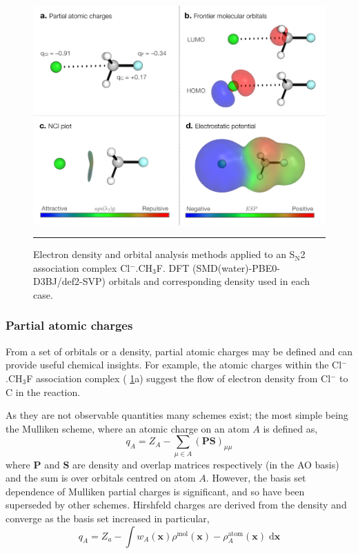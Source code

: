 \documentclass[main.tex]{subfiles}
\begin{document}
\begin{figure}[h!]
	\centering
	\includegraphics[width=\textwidth]{2/figs/fig2/analysis.pdf}
	\vspace{0.1cm}
	\hrule
	\caption{Electron density and orbital analysis methods applied to an S$_\text{N}$2 association complex Cl${}^{-}$.CH${}_3$F. DFT (SMD(water)-PBE0-D3BJ/def2-SVP) orbitals and corresponding density used in each case.}
	\label{fig::intro_analysis_methods}
\end{figure}


\subsubsection{Partial atomic charges}

From a set of orbitals or a density, partial atomic charges may be defined and can provide useful chemical insights. For example, the atomic charges within the Cl${}^{-}$.CH${}_3$F association complex (\figurename{ \ref{fig::intro_analysis_methods}a}) suggest the flow of electron density from Cl$^{-}$ to C in the reaction.

As they are not observable quantities many schemes exist; the most simple being the Mulliken scheme, where an atomic charge on an atom $A$ is defined as,\cite{SzaboIntro}
\begin{equation}
	q_A = Z_A - \sum_{\mu \in A} (\boldsymbol{P}\boldsymbol{S})_{\mu \mu}
\end{equation}
where $\boldsymbol{P}$ and $\boldsymbol{S}$ are density and overlap matrices respectively (in the AO basis) and the sum is over orbitals centred on atom $A$. However, the basis set dependence of Mulliken partial charges is significant,\cite{Cusachs1968} and so have been superseded by other schemes. Hirshfeld charges are derived from the density and converge as the basis set increased in particular,\cite{Hirshfeld1977}
\begin{equation}
	q_A = Z_a - \int w_A(\boldsymbol{x}) \rho^\text{mol}(\boldsymbol{x}) - \rho^\text{atom}_A(\boldsymbol{x}) \;\text{d}\boldsymbol{x}
\end{equation}
\end{document}
